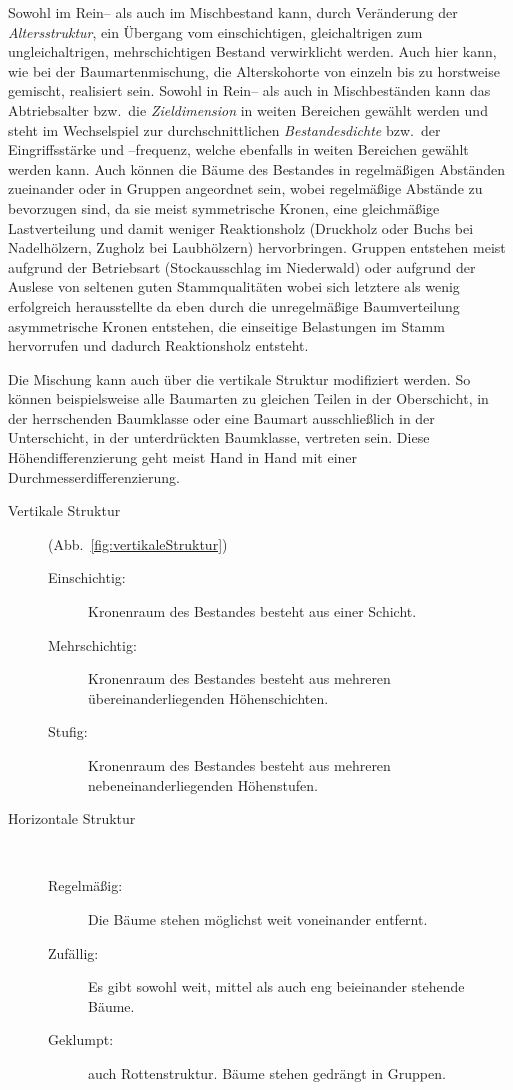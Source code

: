 \documentclass[twocolumn]{scrartcl}
\begin{document}
Sowohl im Rein-- als auch im Mischbestand kann, durch Veränderung der
\emph{Altersstruktur}, ein Übergang vom einschichtigen, gleichaltrigen zum
ungleichaltrigen, mehrschichtigen Bestand verwirklicht werden. Auch hier kann,
wie bei der Baumartenmischung, die Alterskohorte von einzeln bis zu horstweise
gemischt, realisiert sein. Sowohl in Rein-- als auch in Mischbeständen kann das
Abtriebsalter bzw.\ die \emph{Zieldimension} in weiten Bereichen gewählt werden
und steht im Wechselspiel zur durchschnittlichen \emph{Bestandesdichte} bzw.\
der Eingriffsstärke und --frequenz, welche ebenfalls in weiten Bereichen gewählt
werden kann. Auch können die Bäume des Bestandes in regelmäßigen Abständen
zueinander oder in Gruppen angeordnet sein, wobei regelmäßige Abstände zu
bevorzugen sind, da sie meist symmetrische Kronen, eine gleichmäßige
Lastverteilung und damit weniger Reaktionsholz (Druckholz oder Buchs bei
Nadelhölzern, Zugholz bei Laubhölzern) hervorbringen. Gruppen entstehen meist
aufgrund der Betriebsart (Stockausschlag im Niederwald) oder aufgrund der
Auslese von seltenen guten Stammqualitäten
\citep{kato1969Buchendurchforstung,kato1988Gruppendurchforstung} wobei sich
letztere als wenig erfolgreich herausstellte da eben durch die unregelmäßige
Baumverteilung asymmetrische Kronen entstehen, die einseitige Belastungen im
Stamm hervorrufen und dadurch Reaktionsholz entsteht.

Die Mischung kann auch über die vertikale Struktur modifiziert
werden. So können beispielsweise alle Baumarten zu gleichen Teilen in
der Oberschicht, in der herrschenden Baumklasse oder eine Baumart
ausschließlich in der Unterschicht, in der unterdrückten Baumklasse,
vertreten sein. Diese Höhendifferenzierung geht meist Hand in Hand mit
einer Durchmesserdifferenzierung.

\begin{description}
\item[Vertikale Struktur] (Abb.~\ref{fig:vertikaleStruktur})
  \begin{description}
  \item[Einschichtig:] Kronenraum des Bestandes besteht aus einer Schicht.
  \item[Mehrschichtig:] Kronenraum des Bestandes besteht aus mehreren übereinanderliegenden Höhenschichten.
  \item[Stufig:] Kronenraum des Bestandes besteht aus mehreren nebeneinanderliegenden Höhenstufen.
  \end{description}
\item[Horizontale Struktur]~
  \begin{description}
  \item[Regelmäßig:] Die Bäume stehen möglichst weit voneinander entfernt.
  \item[Zufällig:] Es gibt sowohl weit, mittel als auch eng beieinander stehende Bäume.
  \item[Geklumpt:] auch Rottenstruktur. Bäume stehen gedrängt in Gruppen.
  \end{description}
\end{description}
\end{document}
